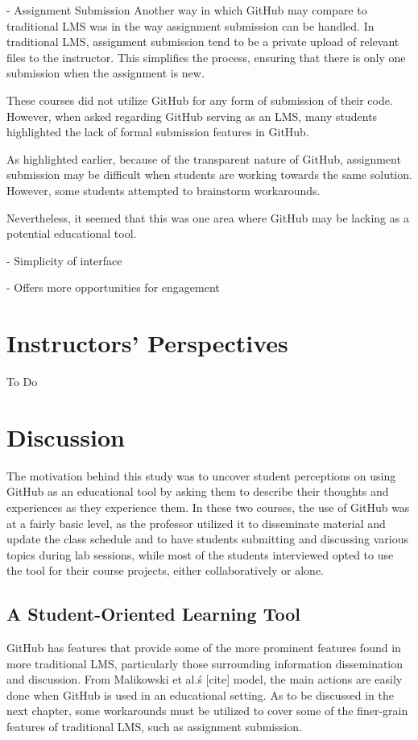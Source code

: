 - Assignment Submission
Another way in which GitHub may compare to traditional LMS was in the way assignment submission can be handled. In traditional LMS, assignment submission tend to be a private upload of relevant files to the instructor. This simplifies the process, ensuring that there is only one submission when the assignment is new.

These courses did not utilize GitHub for any form of submission of their code. However, when asked regarding GitHub serving as an LMS, many students highlighted the lack of formal submission features in GitHub. %

As highlighted earlier, because of the transparent nature of GitHub, assignment submission may be difficult when students are working towards the same solution. %
However, some students attempted to brainstorm workarounds. %

Nevertheless, it seemed that this was one area where GitHub may be lacking as a potential educational tool.

- Simplicity of interface

- Offers more opportunities for engagement

\section{Instructors' Perspectives}
To Do

\section{Discussion}
The motivation behind this study was to uncover student perceptions on using GitHub as an educational tool by asking them to describe their thoughts and experiences as they experience them. In these two courses, the use of GitHub was at a fairly basic level, as the professor utilized it to disseminate material and update the class schedule and to have students submitting and discussing various topics during lab sessions, while most of the students interviewed opted to use the tool for their course projects, either collaboratively or alone.

\subsection{A Student-Oriented Learning Tool}
GitHub has features that provide some of the more prominent features found in more traditional LMS, particularly those surrounding information dissemination and discussion. From Malikowski et al.\'s [cite] model, the main actions are easily done when GitHub is used in an educational setting. As to be discussed in the next chapter, some workarounds must be utilized to cover some of the finer-grain features of traditional LMS, such as assignment submission.

